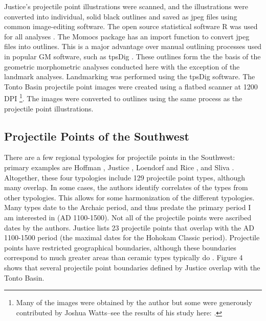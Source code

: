 \documentclass[a4paper]{article}
\begin{document}
Justice's projectile point illustrations were scanned, and the illustrations were converted into individual, solid black outlines and saved as jpeg files using common image-editing software. The open source statistical software R was used for all analyses \autocite{R_Core_Team2022-wb}. The Momocs package \autocite{Bonhomme2014-gt} has an import function to convert jpeg files into outlines. This is a major advantage over manual outlining processes used in popular GM software, such as tpsDig \autocite{James_Rohlf2015-ui}. These outlines form the the basis of the geometric morphometric analyses conducted here with the exception of the landmark analyses. Landmarking was performed using the tpsDig software. The Tonto Basin projectile point images were created using a flatbed scanner at 1200 DPI \footnote{Many of the images were obtained by the author but some were generously contributed by Joshua Watts--see the results of his study here: \autocite{Watts2013-ub}.}. The images were converted to outlines using the same process as the projectile point illustrations.

\hypertarget{projectile-points-of-the-southwest}{%
\subsection*{Projectile Points of the Southwest}\label{projectile-points-of-the-southwest}}

There are a few regional typologies for projectile points in the Southwest: primary examples are Hoffman \autocite*{Hoffman1997-hb}, Justice \autocite*{Justice2002-cf}, Loendorf and Rice \autocite*{Loendorf2004-tp}, and Sliva \autocite*{Sliva2006-nq}. Altogether, these four typologies include 129 projectile point types, although many overlap. In some cases, the authors identify correlates of the types from other typologies. This allows for some harmonization of the different typologies. Many types date to the Archaic period, and thus predate the primary period I am interested in (AD 1100-1500). Not all of the projectile points were ascribed dates by the authors. Justice lists 23 projectile points that overlap with the AD 1100-1500 period (the maximal dates for the Hohokam Classic period). Projectile points have restricted geographical boundaries, although these boundaries correspond to much greater areas than ceramic types typically do \autocite{Buchanan2019-vn}. Figure 4 shows that several projectile point boundaries defined by Justice overlap with the Tonto Basin.
\end{document}

